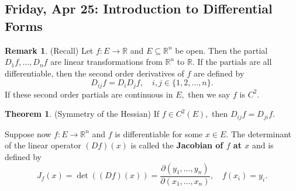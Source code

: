 \documentclass[10pt, oneside]{article}
\newcommand{\bbR}{\mathbb{R}}
\theoremstyle{definition}
\newtheorem{thm}{Theorem}
\newtheorem{rem}{Remark}
\begin{document}
\subsection{Friday, Apr 25: Introduction to Differential Forms}
\begin{rem} (Recall)
    Let $f: E\to \bbR$ and $E\subseteq \bbR^n$ be open. Then the partial $D_1 f, \dots, D_n f$ are linear transformations from $\bbR^n$ to $\bbR.$ If the partials are all differentiable, then the second order derivatives of $f$ are defined by 
    \[D_{ij}f = D_i D_j f, \quad i,j \in \{1,2, \dots, n\}.\] If these second order partials are continuous in $E,$ then we say $f$ is $C^2.$ 
\begin{thm} (Symmetry of the Hessian)
    If $f \in C^2(E),$ then $D_{ij}f = D_{ji}f.$ 
\end{thm} Suppose now $f: E\to \bbR^n$ and $f$ is differentiable for some $x\in E.$ The determinant of the linear operator $(Df)(x)$ is called the \textbf{Jacobian of $f$ at $x$} and is defined by 
\[J_f(x) = \det ((Df)(x)) = \frac{\partial (y_1, \dots, y_n)}{\partial(x_1, \dots, x_n)}, \quad f(x_i) = y_i.\]
\end{rem}
\end{document}
